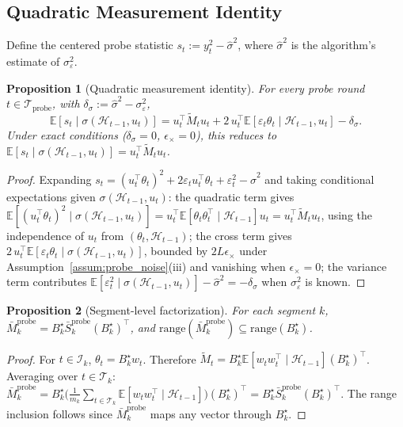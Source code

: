 \documentclass[11pt]{article}
\newcommand{\E}{\mathbb{E}}
\newcommand{\cH}{\mathcal{H}}
\newcommand{\cT}{\mathcal{T}}
\newcommand{\cI}{\mathcal{I}}
\newcommand{\cTprobe}{\mathcal{T}_{\mathrm{probe}}}
\newcommand{\range}{\mathrm{range}}
\newtheorem{proposition}{Proposition}
\begin{document}
\subsection{Quadratic Measurement Identity}
\label{sec:id_quadratic}

Define the centered probe statistic $s_t := y_t^2 - \hat\sigma^2$, where
$\hat\sigma^2$ is the algorithm's estimate of $\sigma_\varepsilon^2$.

\begin{proposition}[Quadratic measurement identity]
\label{prop:quad}
For every probe round $t\in\cTprobe$, with
$\delta_\sigma := \hat\sigma^2-\sigma_\varepsilon^2$,
\[
\E[s_t\mid\sigma(\cH_{t-1},u_t)]
= u_t^\top\widetilde{M}_t u_t
  + 2\,u_t^\top\E[\varepsilon_t\theta_t\mid\cH_{t-1},u_t]
  - \delta_\sigma.
\]
Under exact conditions ($\delta_\sigma=0$, $\epsilon_\times=0$), this reduces to
$\E[s_t\mid\sigma(\cH_{t-1},u_t)] = u_t^\top\widetilde{M}_t u_t$.
\end{proposition}

\begin{proof}
Expanding $s_t = (u_t^\top\theta_t)^2 + 2\varepsilon_t u_t^\top\theta_t
+ \varepsilon_t^2 - \hat\sigma^2$ and taking conditional expectations given
$\sigma(\cH_{t-1},u_t)$:
the quadratic term gives
$\E[(u_t^\top\theta_t)^2\mid\sigma(\cH_{t-1},u_t)]
= u_t^\top\E[\theta_t\theta_t^\top\mid\cH_{t-1}]u_t
= u_t^\top\widetilde{M}_t u_t$,
using the independence of $u_t$ from $(\theta_t,\cH_{t-1})$;
the cross term gives
$2\,u_t^\top\E[\varepsilon_t\theta_t\mid\sigma(\cH_{t-1},u_t)]$,
bounded by $2L\epsilon_\times$ under Assumption~\ref{assum:probe_noise}(iii)
and vanishing when $\epsilon_\times=0$;
the variance term contributes $\E[\varepsilon_t^2\mid\sigma(\cH_{t-1},u_t)]
-\hat\sigma^2=-\delta_\sigma$ when $\sigma_\varepsilon^2$ is known.
\end{proof}

\begin{proposition}[Segment-level factorization]
\label{prop:segment_factorization}
For each segment $k$,
$\bar{M}_k^{\mathrm{probe}}
= B_k^\star\bar{S}_k^{\mathrm{probe}}(B_k^\star)^\top$,
and $\range(\bar{M}_k^{\mathrm{probe}})\subseteq\range(B_k^\star)$.
\end{proposition}

\begin{proof}
For $t\in\cI_k$, $\theta_t=B_k^\star w_t$.  Therefore
$\widetilde{M}_t = B_k^\star\E[w_tw_t^\top\mid\cH_{t-1}](B_k^\star)^\top$.
Averaging over $t\in\cT_k$:
$\bar{M}_k^{\mathrm{probe}}
= B_k^\star\bigl(\frac{1}{m_k}\sum_{t\in\cT_k}
  \E[w_tw_t^\top\mid\cH_{t-1}]\bigr)(B_k^\star)^\top
= B_k^\star\bar{S}_k^{\mathrm{probe}}(B_k^\star)^\top$.
The range inclusion follows since $\bar{M}_k^{\mathrm{probe}}$ maps any vector
through $B_k^\star$.
\end{proof}
\end{document}
